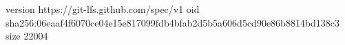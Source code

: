version https://git-lfs.github.com/spec/v1
oid sha256:06eaaf4f6070ce04e15e817099fdb4bfab2d5b5a606d5cd90e86b8814bd138c3
size 22004
